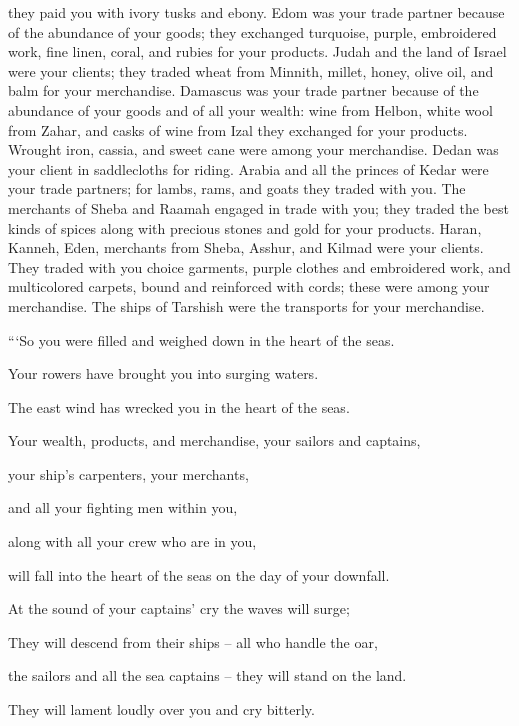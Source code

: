 {they paid
you with ivory
tusks
and ebony.
Edom
was your trade
partner because of the abundance
of your goods;
they exchanged turquoise,
purple,
embroidered work,
fine linen,
coral,
and rubies
for your products.
Judah
and the land
of Israel
were your clients;
they traded
wheat
from Minnith,
millet,
honey,
olive oil,
and balm
for your merchandise.
Damascus
was your trade
partner
because of the abundance
of your goods and of all
your wealth: wine
from Helbon,
white
wool from Zahar,
and casks of wine from Izal they exchanged
for your products.
Wrought
iron,
cassia,
and sweet cane
were
among your merchandise.
Dedan
was your client
in saddlecloths
for riding.
Arabia
and all
the princes
of Kedar
were
your trade
partners;
for lambs,
rams,
and goats
they traded with you.
The merchants
of Sheba
and Raamah
engaged in trade
with you; they
traded
the best
kinds
of spices
along with precious
stones
and gold
for your products.
Haran,
Kanneh,
Eden,
merchants
from Sheba,
Asshur,
and Kilmad
were your clients.
They
traded
with you choice
garments,
purple
clothes
and embroidered work,
and multicolored
carpets,
bound
and reinforced with cords;
these were among your merchandise.
The ships
of Tarshish
were the transports
for your merchandise.
\par }{\Q “‘So you were filled
and weighed down in the heart
of the seas.
\par }{\Q {}Your rowers
have brought
you into surging
waters.
\par }{\Q The east
wind
has wrecked
you in the heart
of the seas.
\par }{\Q {}Your wealth,
products,
and merchandise,
your sailors
and captains,
\par }{\Q your ship’s carpenters,
your merchants,
\par }{\Q and all
your fighting
men
within you,
\par }{\Q along with
all
your crew
who
are in
you,
\par }{\Q will fall
into the heart
of the seas
on the day
of your downfall.
\par }{\Q {}At
the sound
of your captains’
cry the waves will surge;
\par }{\Q {}They will descend
from their ships
– all
who handle
the oar,
\par }{\Q the sailors
and all
the sea
captains
– they will stand
on the land.
\par }{\Q {}They will lament
loudly
over
you and cry
bitterly.
}
